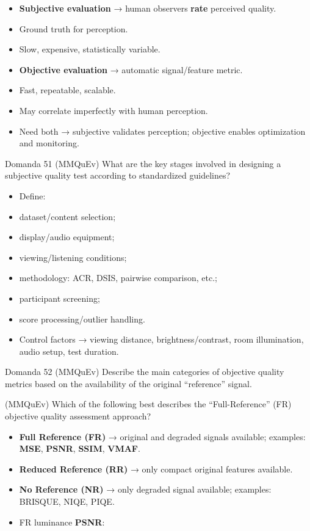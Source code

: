\begin{itemize}
  \item \textbf{Subjective evaluation} → human observers \textbf{rate} perceived quality.
  \item Ground truth for perception.
  \item Slow, expensive, statistically variable.
  \item \textbf{Objective evaluation} → automatic signal/feature metric.
  \item Fast, repeatable, scalable.
  \item May correlate imperfectly with human perception.
  \item Need both → subjective validates perception; objective enables optimization and monitoring.
\end{itemize}



\begin{questionbox}{Domanda 51}
(MMQuEv) What are the key stages involved in designing a subjective quality test according to standardized guidelines?
\end{questionbox}


\begin{itemize}
  \item Define:
  \item dataset/content selection;
  \item display/audio equipment;
  \item viewing/listening conditions;
  \item methodology: ACR, DSIS, pairwise comparison, etc.;
  \item participant screening;
  \item score processing/outlier handling.
  \item Control factors → viewing distance, brightness/contrast, room illumination, audio setup, test duration.
\end{itemize}



\begin{questionbox}{Domanda 52}
(MMQuEv) Describe the main categories of objective quality metrics based on the availability of the original “reference” signal.

(MMQuEv) Which of the following best describes the “Full-Reference” (FR) objective quality assessment approach?
\end{questionbox}


\begin{itemize}
  \item \textbf{Full Reference (FR)} → original and degraded signals available; examples: \textbf{MSE}, \textbf{PSNR}, \textbf{SSIM}, \textbf{VMAF}.
  \item \textbf{Reduced Reference (RR)} → only compact original features available.
  \item \textbf{No Reference (NR)} → only degraded signal available; examples: BRISQUE, NIQE, PIQE.
  \item FR luminance \textbf{PSNR}:
\end{itemize}


